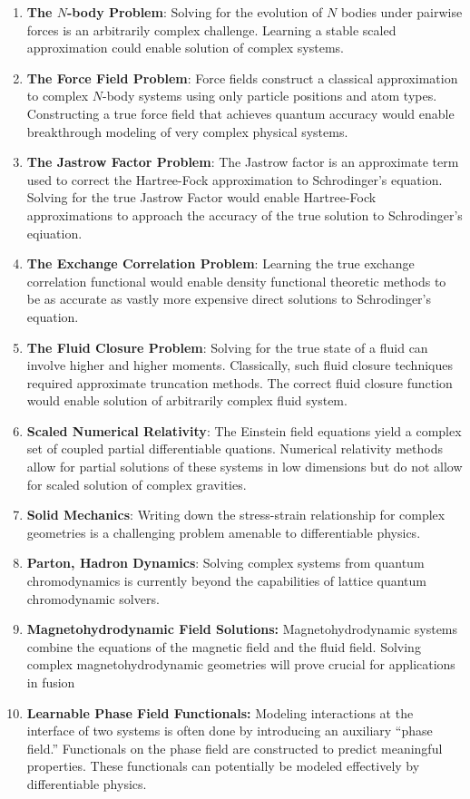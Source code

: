 \documentclass[book.tex]{subfiles}
\begin{document}
\begin{enumerate}
    \item \textbf{The $N$-body Problem}: Solving for the evolution of $N$ bodies under pairwise forces is an arbitrarily complex challenge. Learning a stable scaled approximation could enable solution of complex systems.
    \item \textbf{The Force Field Problem}: Force fields construct a classical approximation to complex $N$-body systems using only particle positions and atom types. Constructing a true force field that achieves quantum accuracy would enable breakthrough modeling of very complex physical systems. 
    \item \textbf{The Jastrow Factor Problem}: The Jastrow factor is an approximate term used to correct the Hartree-Fock approximation to Schrodinger's equation. Solving for the true Jastrow Factor would enable Hartree-Fock approximations to approach the accuracy of the true solution to Schrodinger's eqiuation.
    \item \textbf{The Exchange Correlation Problem}: Learning the true exchange correlation functional would enable density functional theoretic methods to be as accurate as vastly more expensive direct solutions to Schrodinger's equation.
    \item \textbf{The Fluid Closure Problem}: Solving for the true state of a fluid can involve higher and higher moments. Classically, such fluid closure techniques required approximate truncation methods. The correct fluid closure function would enable solution of arbitrarily complex fluid system.
    \item \textbf{Scaled Numerical Relativity}: The Einstein field equations yield a complex set of coupled partial differentiable quations. Numerical relativity methods allow for partial solutions of these systems in low dimensions but do not allow for scaled solution of complex gravities.
    \item \textbf{Solid Mechanics}: Writing down the stress-strain relationship for complex geometries is a challenging problem amenable to differentiable physics.
    \item \textbf{Parton, Hadron Dynamics}: Solving complex systems from quantum chromodynamics is currently beyond the capabilities of lattice quantum chromodynamic solvers.
    \item \textbf{Magnetohydrodynamic Field Solutions:} Magnetohydrodynamic systems combine the equations of the magnetic field and the fluid field. Solving complex magnetohydrodynamic geometries will prove crucial for applications in fusion
    \item \textbf{Learnable Phase Field Functionals:} Modeling interactions at the interface of two systems is often done by introducing an auxiliary ``phase field.'' Functionals on the phase field are constructed to predict meaningful properties. These functionals can potentially be modeled effectively by differentiable physics.
\end{enumerate}
\end{document}
